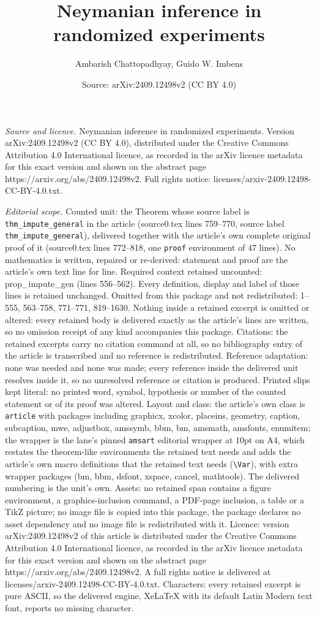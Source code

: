 \documentclass[10pt,a4paper]{amsart}
\title[Neymanian inference in randomized experiments]{Neymanian inference in randomized experiments}
\author{Ambarish Chattopadhyay, Guido W. Imbens}
\date{Source: arXiv:2409.12498v2 (CC BY 4.0)}
\begin{document}
\maketitle

\noindent\emph{Source and licence.} Neymanian inference in randomized experiments. Version arXiv:2409.12498v2 (CC BY 4.0), distributed under the Creative Commons Attribution 4.0 International licence, as recorded in the arXiv licence metadata for this exact version and shown on the abstract page https://arxiv.org/abs/2409.12498v2. Full rights notice: licenses/arxiv-2409.12498-CC-BY-4.0.txt.\par\smallskip

\noindent\textit{Editorial scope.} Counted unit: the Theorem whose source label is \texttt{thm\_impute\_general} in the article (source0.tex lines 759--770, source label \texttt{thm\_impute\_general}), delivered together with the article's own complete original proof of it (source0.tex lines 772--818, one \texttt{proof} environment of 47 lines). No mathematics is written, repaired or re-derived: statement and proof are the article's own text line for line. Required context retained uncounted: prop\_impute\_gen (lines 556--562). Every definition, display and label of those lines is retained unchanged. Omitted from this package and not redistributed: 1--555, 563--758, 771--771, 819--1630. Nothing inside a retained excerpt is omitted or altered: every retained body is delivered exactly as the article's lines are written, so no omission receipt of any kind accompanies this package. Citations: the retained excerpts carry no citation command at all, so no bibliography entry of the article is transcribed and no reference is redistributed. Reference adaptation: none was needed and none was made; every reference inside the delivered unit resolves inside it, so no unresolved reference or citation is produced. Printed slips kept literal: no printed word, symbol, hypothesis or number of the counted statement or of its proof was altered. Layout and class: the article's own class is \texttt{article} with packages including graphicx, xcolor, placeins, geometry, caption, subcaption, mwe, adjustbox, amssymb, bbm, bm, amsmath, amsfonts, enumitem; the wrapper is the lane's pinned \texttt{amsart} editorial wrapper at 10pt on A4, which restates the theorem-like environments the retained text needs and adds the article's own macro definitions that the retained text needs (\texttt{\textbackslash Var}), with extra wrapper packages (bm, bbm, dsfont, xspace, cancel, mathtools). The delivered numbering is the unit's own. Assets: no retained span contains a figure environment, a graphics-inclusion command, a PDF-page inclusion, a table or a TikZ picture; no image file is copied into this package, the package declares no asset dependency and no image file is redistributed with it. Licence: version arXiv:2409.12498v2 of this article is distributed under the Creative Commons Attribution 4.0 International licence, as recorded in the arXiv licence metadata for this exact version and shown on the abstract page https://arxiv.org/abs/2409.12498v2. A full rights notice is delivered at licenses/arxiv-2409.12498-CC-BY-4.0.txt. Characters: every retained excerpt is pure ASCII, so the delivered engine, XeLaTeX with its default Latin Modern text font, reports no missing character.
\end{document}
